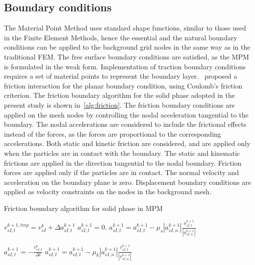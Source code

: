\subsection{Boundary conditions}
The Material Point Method uses standard shape functions, similar to those used 
in the Finite Element Methods, hence the essential and the natural boundary 
conditions can be applied to the background grid nodes in the same way as in 
the traditional FEM. The free surface boundary conditions are satisfied, as the 
MPM is formulated in the weak form. Implementation of traction boundary 
conditions requires a set of material points to represent the boundary 
layer.~\citet{Bandara2013} proposed a friction interaction for the planar 
boundary condition, using Coulomb's friction criterion. The friction boundary 
algorithm for the solid phase adopted in the present study is shown 
in~\cref{alg:friction}. The friction boundary conditions are applied on the 
mesh nodes by controlling the nodal acceleration tangential to the boundary. 
The nodal accelerations are considered to include the frictional effects 
instead of the forces, as the forces are proportional to the corresponding 
accelerations. Both static and kinetic friction are considered, and are applied 
only when the particles are in contact with the boundary. The static and 
kinematic frictions are applied in the direction tangential to the nodal 
boundary. Friction forces are applied only if the particles are in contact. 
The normal velocity and acceleration on the boundary plane is zero. 
Displacement boundary conditions are applied as velocity constraints on the 
nodes in the background mesh.

\begin{algorithm}[tbhp]
\caption{Friction boundary algorithm for solid phase in MPM~\citep{Bandara2013}}
\label{alg:friction}
\begin{algorithmic}
    \State $v_{sI,t}^{k+1,tmp}=v_{sI}^k+\Delta a_{sI,t}^{k+1}$
     
            \State $a_{sI,t}^{k+1}= 0.$
        \Else {}
            \State $a_{sI,t}^{k+1} = a_{sI,t}^{k+1} - \mu_s  \left| a_{sI,n}^{k+1} \right| \frac{a_{sI,t}^{k+1}}{ \left| a_{sI,n}^{k+1} \right|}$

        \EndIf
    \Else  {}
            \State $a_{sI,t}^{k+1} = - \frac{v_{sI,t}^{k}}{\Delta t}$
        \Else {}
            \State $a_{sI,t}^{k+1} = a_{sI,t}^{k+1} - \mu_k  \left| a_{sI,n}^{k+1} \right| \frac{v_{sI,t}^{k+1}}{ \left| v_{sI,n}^{k+1} \right|}$
        \EndIf
    \EndIf
\EndIf
\end{algorithmic}
\end{algorithm}

